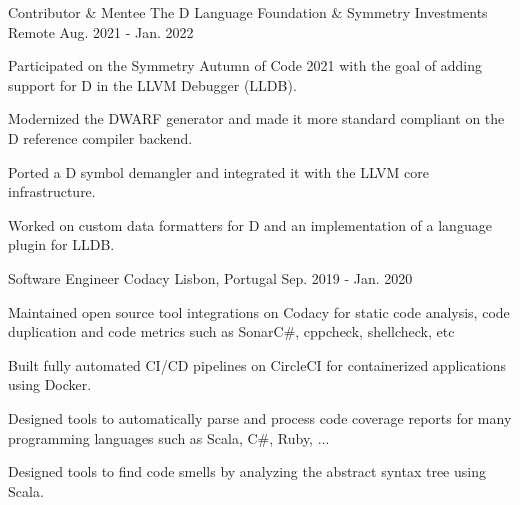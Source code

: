 

\begin{cventries}

  \cventry
    {Contributor \& Mentee} %
    {The D Language Foundation \scriptsize \& Symmetry Investments} %
    {Remote} %
    {Aug. 2021 - Jan. 2022} %
    {
      \begin{cvitems} %
      \item {Participated on the Symmetry Autumn of Code 2021 with the goal of adding support for D in the LLVM Debugger (LLDB).}
        \item {Modernized the DWARF generator and made it more standard compliant on the D reference compiler backend.}
        \item {Ported a D symbol demangler and integrated it with the LLVM core infrastructure.}
        \item {Worked on custom data formatters for D and an implementation of a language plugin for LLDB.}
      \end{cvitems}
    }


  \cventry
    {Software Engineer} %
    {Codacy} %
    {Lisbon, Portugal} %
    {Sep. 2019 - Jan. 2020} %
    {
      \begin{cvitems} %
        \item {Maintained open source tool integrations on Codacy for static code analysis, code duplication and code metrics such as SonarC\#, cppcheck, shellcheck, etc}
        \item {Built fully automated CI/CD pipelines on CircleCI for containerized applications using Docker.}
        \item {Designed tools to automatically parse and process code coverage reports for many programming languages such as Scala, C\#, Ruby, ...}
        \item {Designed tools to find code smells by analyzing the abstract syntax tree using Scala.}
      \end{cvitems}
    }


\end{cventries}
